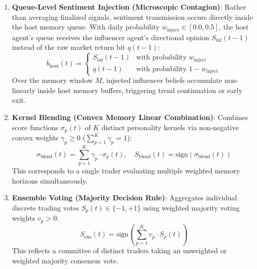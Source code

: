 \documentclass[11pt,a4paper]{article}
\begin{document}
\begin{enumerate}
    \item \textbf{Queue-Level Sentiment Injection (Microscopic Contagion)}: Rather than averaging finalized signals, sentiment transmission occurs directly inside the host memory queue. With daily probability $w_{\text{inject}} \in [0.0, 0.5]$, the host agent's queue receives the influencer agent's directional opinion $S_{\text{inf}}(t-1)$ instead of the raw market return bit $q(t-1)$:
    \begin{equation}
        b_{\text{host}}(t) = 
        \begin{cases}
            S_{\text{inf}}(t-1) & \text{with probability } w_{\text{inject}} \\
            q(t-1) & \text{with probability } 1 - w_{\text{inject}}
        \end{cases}
    \end{equation}
    Over the memory window $M$, injected influencer beliefs accumulate non-linearly inside host memory buffers, triggering trend continuation or early exit.

    \item \textbf{Kernel Blending (Convex Memory Linear Combination)}: Combines score functions $\sigma_p(t)$ of $K$ distinct personality kernels via non-negative convex weights $\gamma_p \ge 0$ ($\sum_{p=1}^K \gamma_p = 1$):
    \begin{equation}
        \sigma_{\text{blend}}(t) = \sum_{p=1}^K \gamma_p \cdot \sigma_p(t), \quad S_{\text{blend}}(t) = \text{sign}\left( \sigma_{\text{blend}}(t) \right)
    \end{equation}
    This corresponds to a single trader evaluating multiple weighted memory horizons simultaneously.

    \item \textbf{Ensemble Voting (Majority Decision Rule)}: Aggregates individual discrete trading votes $S_p(t) \in \{-1, +1\}$ using weighted majority voting weights $v_p > 0$:
    \begin{equation}
        S_{\text{ens}}(t) = \text{sign}\left( \sum_{p=1}^K v_p \cdot S_p(t) \right)
    \end{equation}
    This reflects a committee of distinct traders taking an unweighted or weighted majority consensus vote.


\end{enumerate}
\end{document}
